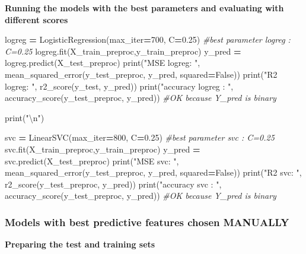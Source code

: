\documentclass[10pt,a4paper]{article}
\newenvironment{Shaded}{\begin{snugshade}}{\end{snugshade}}
\newcommand{\BuiltInTok}[1]{#1}
\newcommand{\CharTok}[1]{\textcolor[rgb]{0.31,0.60,0.02}{#1}}
\newcommand{\CommentTok}[1]{\textcolor[rgb]{0.56,0.35,0.01}{\textit{#1}}}
\newcommand{\DecValTok}[1]{\textcolor[rgb]{0.00,0.00,0.81}{#1}}
\newcommand{\FloatTok}[1]{\textcolor[rgb]{0.00,0.00,0.81}{#1}}
\newcommand{\NormalTok}[1]{#1}
\newcommand{\OperatorTok}[1]{\textcolor[rgb]{0.81,0.36,0.00}{\textbf{#1}}}
\newcommand{\StringTok}[1]{\textcolor[rgb]{0.31,0.60,0.02}{#1}}
\newcommand{\VariableTok}[1]{\textcolor[rgb]{0.00,0.00,0.00}{#1}}
\theoremstyle{break}
\begin{document}
\textbf{Running the models with the best parameters and evaluating with different scores}

\begin{Shaded}
\begin{Highlighting}[]
\NormalTok{logreg }\OperatorTok{=}\NormalTok{ LogisticRegression(max_iter}\OperatorTok{=}\DecValTok{700}\NormalTok{, C}\OperatorTok{=}\FloatTok{0.25}\NormalTok{) }\CommentTok{#best parameter logreg : C=0.25}
\NormalTok{logreg.fit(X_train_preproc,y_train_preproc)}
\NormalTok{y_pred }\OperatorTok{=}\NormalTok{ logreg.predict(X_test_preproc)}
\BuiltInTok{print}\NormalTok{(}\StringTok{"MSE logreg: "}\NormalTok{, mean_squared_error(y_test_preproc, y_pred, squared}\OperatorTok{=}\VariableTok{False}\NormalTok{))}
\BuiltInTok{print}\NormalTok{(}\StringTok{"R2 logreg: "}\NormalTok{, r2_score(y_test, y_pred))}
\BuiltInTok{print}\NormalTok{(}\StringTok{"accuracy logreg : "}\NormalTok{, accuracy_score(y_test_preproc, y_pred)) }\CommentTok{#OK because Y_pred is binary}

\BuiltInTok{print}\NormalTok{(}\StringTok{"}\CharTok{\textbackslash{}n}\StringTok{"}\NormalTok{)}

\NormalTok{svc }\OperatorTok{=}\NormalTok{ LinearSVC(max_iter}\OperatorTok{=}\DecValTok{800}\NormalTok{, C}\OperatorTok{=}\FloatTok{0.25}\NormalTok{) }\CommentTok{#best parameter svc : C=0.25}
\NormalTok{svc.fit(X_train_preproc,y_train_preproc)}
\NormalTok{y_pred }\OperatorTok{=}\NormalTok{ svc.predict(X_test_preproc)}
\BuiltInTok{print}\NormalTok{(}\StringTok{"MSE svc: "}\NormalTok{, mean_squared_error(y_test_preproc, y_pred, squared}\OperatorTok{=}\VariableTok{False}\NormalTok{))}
\BuiltInTok{print}\NormalTok{(}\StringTok{"R2 svc: "}\NormalTok{, r2_score(y_test_preproc, y_pred))}
\BuiltInTok{print}\NormalTok{(}\StringTok{"accuracy svc : "}\NormalTok{, accuracy_score(y_test_preproc, y_pred)) }\CommentTok{#OK because Y_pred is binary}
\end{Highlighting}
\end{Shaded}

\hypertarget{models-with-best-predictive-features-chosen-manually-1}{%
\subsubsection{Models with best predictive features chosen MANUALLY}\label{models-with-best-predictive-features-chosen-manually-1}}

\textbf{Preparing the test and training sets}
\end{document}
